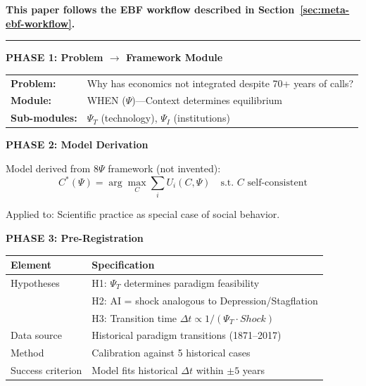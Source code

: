 \begin{tcolorbox}[colback=green!3!white, colframe=green!75!black,
    title=\textbf{EBF WORKFLOW: Applied to This Paper}]

\textbf{This paper follows the EBF workflow described in Section~\ref{sec:meta-ebf-workflow}.}

\vspace{0.5em}
\hrule
\vspace{0.5em}

\textbf{PHASE 1: Problem $\to$ Framework Module}

\begin{tabular}{@{}ll@{}}
\textbf{Problem:} & Why has economics not integrated despite 70+ years of calls? \\
\textbf{Module:} & WHEN ($\Psi$)---Context determines equilibrium \\
\textbf{Sub-modules:} & $\Psi_T$ (technology), $\Psi_I$ (institutions) \\
\end{tabular}

\vspace{0.5em}
\textbf{PHASE 2: Model Derivation}

Model derived from 8$\Psi$ framework (not invented):
\begin{equation*}
C^*(\Psi) = \arg\max_C \sum_i U_i(C, \Psi) \quad \text{s.t. } C \text{ self-consistent}
\end{equation*}

Applied to: Scientific practice as special case of social behavior.

\vspace{0.5em}
\textbf{PHASE 3: Pre-Registration}

\begin{center}
\small
\begin{tabular}{@{}p{3cm}p{8cm}@{}}
\toprule
\textbf{Element} & \textbf{Specification} \\
\midrule
Hypotheses & H1: $\Psi_T$ determines paradigm feasibility \\
           & H2: AI = shock analogous to Depression/Stagflation \\
           & H3: Transition time $\Delta t \propto 1/(\Psi_T \cdot Shock)$ \\
Data source & Historical paradigm transitions (1871--2017) \\
Method & Calibration against 5 historical cases \\
Success criterion & Model fits historical $\Delta t$ within $\pm 5$ years \\
\bottomrule
\end{tabular}
\end{center}


\end{tcolorbox}
